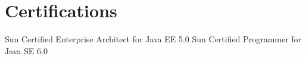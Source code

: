 \documentclass[11pt,a4paper]{moderncv}
\begin{document}
\section{Certifications}
{Sun Certified Enterprise Architect for Java EE 5.0 }{}{}{}{}
\vspace*{0.4\baselineskip}
{Sun Certified Programmer for Java SE 6.0 }{}{}{}{}

\end{document}
